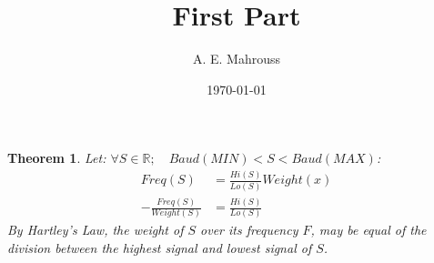 \documentclass[10pt]{article}
\title{%
  \vspace{-1.5em}%
  \large\textbf{First Part}%
}
\author{A. E. Mahrouss}
\date{\today}
\theoremstyle{plain}
\newtheorem{theorem}{Theorem}[section]
\theoremstyle{definition}
\theoremstyle{remark}
\begin{document}
\begin{theorem}
Let:
$\forall S \in \mathbb{R}; \quad Baud(MIN) < S < Baud(MAX)$:
\begin{align*}
	Freq(S) &= \frac{Hi(S)}{Lo(S)} Weight(x)\\
	-\frac{Freq(S)}{Weight(S)} &= \frac{Hi(S)}{Lo(S)}
\end{align*}
By Hartley's Law, the weight of $S$ over its frequency $F$, may be equal of the division between the highest signal and lowest signal of $S$.
\end{theorem}

\nocite{*}



\end{document}
